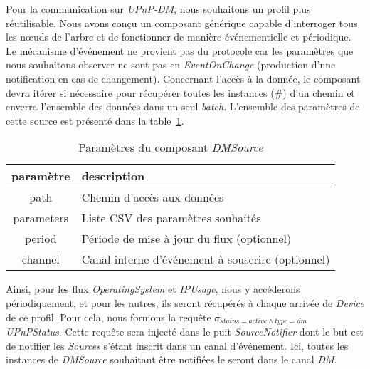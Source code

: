 Pour la communication sur \textit{UPnP-DM}, nous souhaitons un profil plus réutilisable. Nous avons conçu un composant générique capable d'interroger tous les nœuds de l'arbre et de fonctionner de manière événementielle et périodique. Le mécanisme d'événement ne provient pas du protocole car les paramètres que nous souhaitons observer ne sont pas en \textit{EventOnChange} (production d'une notification en cas de changement). Concernant l'accès à la donnée, le composant devra itérer si nécessaire pour récupérer toutes les instances (\#) d'un chemin et enverra l'ensemble des données dans un seul \textit{batch}. L'ensemble des paramètres de cette source est présenté dans la table~\ref{tab:valid:domvision:dmsource}.

\begin{table}[ht]
    \centering
    \begin{tabular}{cl}
        paramètre & description \\ \midrule
        path & Chemin d'accès aux données \\
        parameters & Liste CSV des paramètres souhaités \\
        period & Période de mise à jour du flux (optionnel) \\
        channel & Canal interne d'événement à souscrire (optionnel)
    \end{tabular}
    \caption{Paramètres du composant \textit{DMSource}}\label{tab:valid:domvision:dmsource}
\end{table}

Ainsi, pour les flux \textit{OperatingSystem} et \textit{IPUsage}, nous y accéderons périodiquement, et pour les autres, ils seront récupérés à chaque arrivée de \textit{Device} de ce profil. Pour cela, nous formons la requête $\sigma_{status=active\wedge type=dm}$ \textit{UPnPStatus}. Cette requête sera injecté dans le puit \textit{SourceNotifier} dont le but est de notifier les \textit{Sources} s'étant inscrit dans un canal d'événement. Ici, toutes les instances de \textit{DMSource} souhaitant être notifiées le seront dans le canal \textit{DM}.


